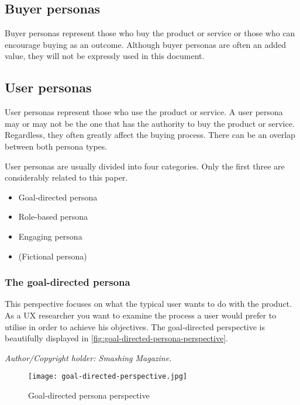     \subsection{Buyer personas}
    Buyer personas represent those who buy the product or service or those who can encourage buying as an outcome. Although buyer personas are often an added value, they will not be expressly used in this document.
    
    \subsection{User personas}
    User personas represent those who use the product or service. A user persona may or may not be the one that has the authority to buy the product or service. Regardless, they often greatly affect the buying process. There can be an overlap between both persona types.
    
    User personas are usually divided into four categories. Only the first three are considerably related to this paper.

    \begin{itemize}
        \setlength\itemsep{-2pt} 
        \item{Goal-directed persona}
        \item{Role-based persona}
        \item{Engaging persona}
        \item{(Fictional persona)}
    \end{itemize}
    
    \subsubsection{The goal-directed persona}
        This perspective focuses on what the typical user wants to do with the product. As a UX researcher you want to examine the process a user would prefer to utilise in order to achieve his objectives. The goal-directed perspective is beautifully displayed in \autoref{fig:goal-directed-persona-perspective}. 
        
       \begin{center} 
        \textit{Author/Copyright holder: Smashing Magazine.}
       \end{center} 
       
        \begin{figure}[h]
            \centering
            \texttt{[image: goal-directed-perspective.jpg]}
            \caption{Goal-directed persona perspective}
            \label{fig:goal-directed-persona-perspective}
        \end{figure}

